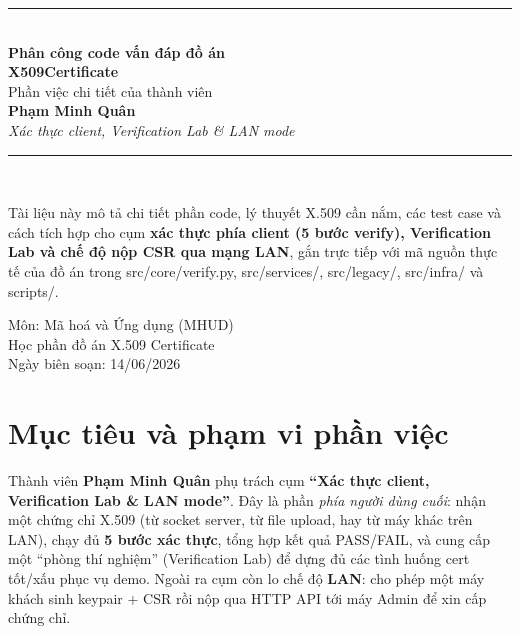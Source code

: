 \documentclass[12pt,a4paper]{article}
\newcommand{\code}[1]{{\ttfamily\small\def\_{\textunderscore\discretionary{}{}{}}#1}}
\begin{document}
\begin{titlepage}
\centering
\vspace*{2.2cm}
{\color{accent}\rule{\linewidth}{1.2pt}}\\[0.6cm]
{\Huge\bfseries Phân công code vấn đáp đồ án}\\[0.35cm]
{\Huge\bfseries\color{accent} X509Certificate}\\[0.5cm]
{\Large Phần việc chi tiết của thành viên}\\[0.3cm]
{\LARGE\bfseries Phạm Minh Quân}\\[0.45cm]
{\large\itshape Xác thực client, Verification Lab \& LAN mode}\\[0.5cm]
{\color{accent}\rule{\linewidth}{1.2pt}}\\[1.4cm]

\begin{minipage}{0.85\linewidth}
\centering\small
Tài liệu này mô tả chi tiết phần code, lý thuyết X.509 cần nắm, các test case
và cách tích hợp cho cụm \textbf{xác thực phía client (5 bước verify),
Verification Lab và chế độ nộp CSR qua mạng LAN}, gắn trực tiếp với mã nguồn
thực tế của đồ án trong \code{src/core/verify.py}, \code{src/services/},
\code{src/legacy/}, \code{src/infra/} và \code{scripts/}.
\end{minipage}

\vfill
{\large Môn: Mã hoá và Ứng dụng (MHUD)}\\[0.2cm]
{\large Học phần đồ án X.509 Certificate}\\[0.6cm]
{\small Ngày biên soạn: 14/06/2026}
\end{titlepage}

\tableofcontents
\thispagestyle{fancy}
\clearpage

\section{Mục tiêu và phạm vi phần việc}

Thành viên \textbf{Phạm Minh Quân} phụ trách cụm \textbf{``Xác thực client,
Verification Lab \& LAN mode''}. Đây là phần \emph{phía người dùng cuối}: nhận
một chứng chỉ X.509 (từ socket server, từ file upload, hay từ máy khác trên LAN),
chạy đủ \textbf{5 bước xác thực}, tổng hợp kết quả PASS/FAIL, và cung cấp một
``phòng thí nghiệm'' (Verification Lab) để dựng đủ các tình huống cert tốt/xấu
phục vụ demo. Ngoài ra cụm còn lo chế độ \textbf{LAN}: cho phép một máy khách sinh
keypair $+$ CSR rồi nộp qua HTTP API tới máy Admin để xin cấp chứng chỉ.
\end{document}
